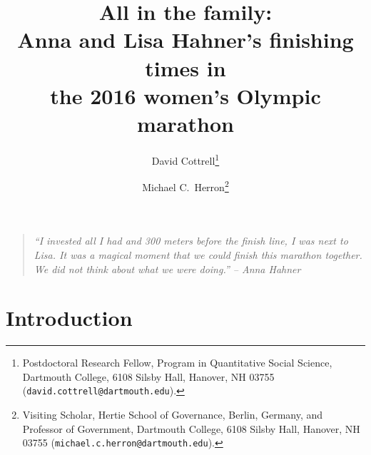 \documentclass[12pt,titlepage]{article}
\begin{document}
\sloppy
\thispagestyle{empty}


\renewcommand{\topfraction}{.85}
\renewcommand{\bottomfraction}{.7}
\renewcommand{\textfraction}{.15}
\renewcommand{\floatpagefraction}{.66}
\renewcommand{\dbltopfraction}{.66}
\renewcommand{\dblfloatpagefraction}{.66}

\newcommand{\yi}{\ensuremath{Y_i}}



\title{\Large{All in the family:\\Anna and Lisa Hahner's finishing
    times in\\the 2016 women's Olympic
  marathon}}\author{David Cottrell\thanks{Postdoctoral Research
  Fellow, Program in Quantitative Social Science, Dartmouth College,
    6108 Silsby Hall, Hanover, NH
    03755 (\texttt{david.cottrell@dartmouth.edu}).} \and Michael C.\
  Herron\thanks{Visiting Scholar, Hertie School of Governance, Berlin,
    Germany, and Professor of Government, Dartmouth College, 6108
    Silsby Hall, Hanover, NH 03755
    (\texttt{michael.c.herron@dartmouth.edu}).}}


\maketitle \doublespacing 




\begin{quote}
  \emph{``I invested all I had and 300 meters before the finish line,
    I was next to Lisa. It was a magical moment that we could finish
    this marathon together. We did not think about what we were
    doing.'' -- Anna Hahner}
\end{quote}


\section*{Introduction}
\end{document}
